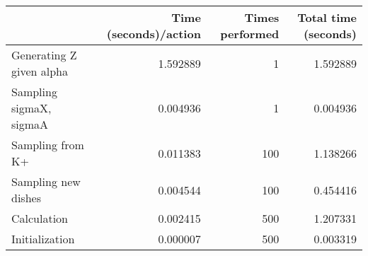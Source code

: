 \begin{tabular}{lrrr}
\toprule
{} &  Time (seconds)/action &  Times performed &  Total time (seconds) \\
\midrule
Generating Z given alpha &               1.592889 &                1 &              1.592889 \\
Sampling sigmaX, sigmaA  &               0.004936 &                1 &              0.004936 \\
Sampling from K+         &               0.011383 &              100 &              1.138266 \\
Sampling new dishes      &               0.004544 &              100 &              0.454416 \\
Calculation              &               0.002415 &              500 &              1.207331 \\
Initialization           &               0.000007 &              500 &              0.003319 \\
\bottomrule
\end{tabular}
